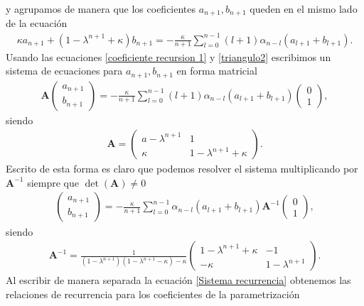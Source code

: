 y agrupamos de manera que los coeficientes $a_{n+1},b_{n+1}$ queden en el mismo lado de la ecuación
\begin{eqnarray}
\kappa a_{n+1}+(1-\lambda^{n+1}+\kappa)b_{n+1}=-\frac{\kappa}{n+1}\sum_{l=0}^{n-1}(l+1)\alpha_{n-l}
(a_{l+1}+b_{l+1}).
\label{triangulo2}
\end{eqnarray}
Usando las ecuaciones \ref{coeficiente recursion 1} y \ref{triangulo2} escribimos un sistema de ecuaciones para $a_{n+1},b_{n+1}$ en forma matricial
\begin{eqnarray}
\mathbf{A}\begin{pmatrix}
a_{n+1}\\
b_{n+1}
\end{pmatrix}=-\frac{\kappa}{n+1}\sum_{l=0}^{n-1}(l+1)\alpha_{n-l}(a_{l+1}+b_{l+1})\begin{pmatrix}
0\\
1
\end{pmatrix},
\label{sistema recurrencia}
\end{eqnarray}
siendo 
\begin{eqnarray}
\mathbf{A}=\begin{pmatrix}
a-\lambda^{n+1} & 1 \\
\kappa & 1-\lambda^{n+1}+\kappa
\end{pmatrix}.
\end{eqnarray}
Escrito de esta forma es claro que podemos resolver el sistema multiplicando por $\mathbf{A}^{-1}$ siempre que $\det(\mathbf{A})\neq 0$
\begin{eqnarray}
\begin{pmatrix}
a_{n+1}\\
b_{n+1}
\end{pmatrix}=-\frac{\kappa}{n+1}\sum_{l=0}^{n-1}\alpha_{n-l}(a_{l+1}+b_{l+1})\mathbf{A}^{-1}\begin{pmatrix}
0\\
1
\end{pmatrix},
\label{Sistema recurrencia}
\end{eqnarray}
siendo
\begin{eqnarray}
\mathbf{A}^{-1}=\frac{1}{(1-\lambda^{n+1})(1-\lambda^{n+1}-\kappa)-\kappa}\begin{pmatrix}
1-\lambda^{n+1}+\kappa & -1\\
-\kappa & 1-\lambda^{n+1}
\end{pmatrix}.
\end{eqnarray}
Al escribir de manera separada la ecuación \ref{Sistema recurrencia} obtenemos las relaciones de recurrencia para los coeficientes de la parametrización
